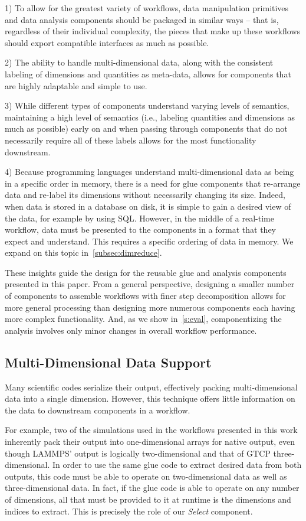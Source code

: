 1) To allow for the greatest variety of workflows,
data manipulation primitives and data analysis components
should be packaged in similar ways -- that is,
regardless of their individual complexity,
the pieces that make up these workflows
should export compatible interfaces as much as possible.

2) The ability to handle multi-dimensional data,
along with the consistent labeling of
dimensions and quantities as meta-data,
allows for components that are highly
adaptable and simple to use.

3) While different types of components understand
varying levels of semantics, maintaining a
high level of semantics (i.e., labeling
quantities and dimensions as much
as possible) early on and when passing
through components that do not necessarily
require all of these labels allows for the most
functionality downstream.

4) Because programming languages understand
multi-dimensional data as being in a
specific order in memory, there is a need for
glue components that re-arrange data and
re-label its dimensions without necessarily
changing its size. Indeed, when data is stored
in a database on disk, it is simple to gain a desired
view of the data, for example by using SQL.
However, in the middle of a real-time workflow,
data must be presented to the components in a
format that they expect and understand.
This requires a specific ordering of data in
memory. We expand on this topic in~\autoref{subsec:dimreduce}.

These insights guide the design for the
reusable glue and analysis
components presented in this
paper. From a general perspective, designing a smaller number of
components to assemble workflows with finer step decomposition
allows for more general processing
than designing more numerous components each having more
complex functionality.
And, as we show in~\autoref{s:eval}, componentizing
the analysis involves only minor changes
in overall workflow performance.

\subsection{Multi-Dimensional Data Support}

Many scientific codes serialize their output, effectively packing
multi-dimensional data into a single dimension.
However, this technique offers
little information on the data to downstream
components in a workflow.

For example, two of the simulations used in the
workflows presented in this work inherently
pack their output into one-dimensional arrays
for native output, even
though LAMMPS' output is logically
two-dimensional and that
of GTCP three-dimensional.
In order to use the same glue code to
extract desired data from both outputs,
this code must be able to operate on two-dimensional data
as well as three-dimensional data.
In fact, if the glue code is able to operate
on any number of dimensions, all that must be provided to it
at runtime is the dimensions and indices to extract.
This is precisely the role of our
{\em Select} component.

